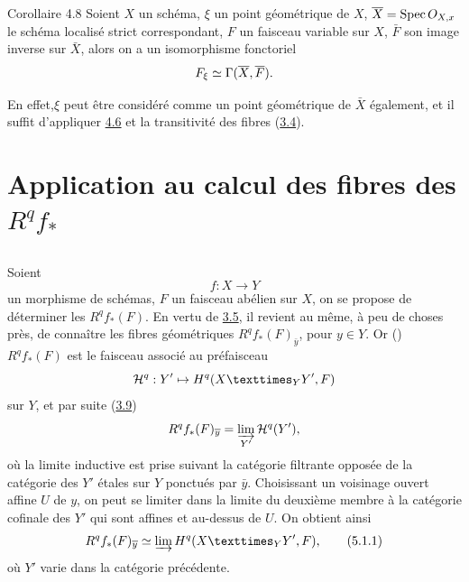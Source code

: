 \documentclass[10pt]{../fichiers-configuration-latex/smfart}
\begin{document}
\begin{enonce*}{Corollaire 4.8}
Soient $X$ un schéma, $\xi$ un point géométrique de $X$, $\overline{X} =
\operatorname{Spec} O_{X, x}$ le schéma localisé strict correspondant, $F$ un
faisceau variable sur $X$, $\bar{F}$ son image inverse sur
$\bar{X}$, alors on a un isomorphisme fonctoriel
$$
F_{\xi} \simeq \Gamma (\overline{X}, \overline{F}){}.
$$
\end{enonce*}

\noindent
En effet,\pageoriginale $\xi$ peut être considéré comme un point géométrique de
$\bar{X}$ également, et il suffit d'appliquer \hyperref[VIII.prop4.6]{4.6}
et la transitivité
des fibres (\hyperref[VIII.subsec3.4]{3.4}).

\section{Application au calcul des fibres des $R^{q}
  f_{*}$}

\subsection{}

Soient
$$
f : X \to Y
$$
un morphisme de schémas, $F$ un faisceau abélien sur $X$, on se
propose de déterminer les $R^q f_{\ast} (F)$. En vertu de
\hyperref[VIII.thm3.5]{3.5}, il revient au même, à peu de choses près, de
connaître les fibres géométriques $R^q f_{\ast} (F)_{\bar{y}}$, pour
$y \in Y$. Or () $R^q f_{\ast}(F)$ est le faisceau
associé au préfaisceau
$$
\Hh^q : Y' \mapsto H^q (\fprod{X}{Y'}{Y}, F)
$$
sur $Y$, et par suite (\hyperref[VIII.prop3.9]{3.9})
$$
R^q f_{\ast} (F)_{\overline{y}} = \varinjlim_{Y'} {\mathcal H}^q (Y'){},
$$
où la limite inductive est prise suivant la catégorie filtrante
opposée de la catégorie des $Y'$ étales sur $Y$ ponctués par
$\bar{y}$. Choisissant un voisinage ouvert affine $U$ de $y$, on peut
se limiter dans la limite du deuxième membre à la catégorie cofinale
des $Y'$ qui sont affines et au-dessus de $U$. On obtient ainsi
\begin{equation*}
R^q f_{\ast} (F)_{\bar{y}} \simeq \varinjlim H^q (\fprod{X}{Y'}{Y},
F){\quoi},\tag{5.1.1}
\end{equation*}
où $Y'$ varie dans la catégorie précédente.
\end{document}

